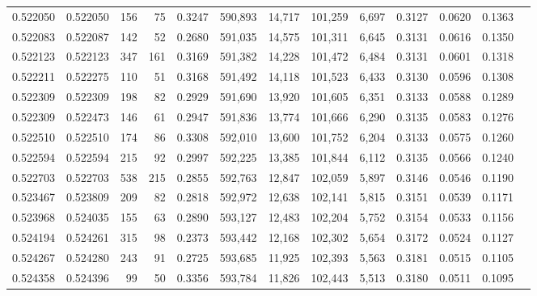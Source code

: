 \begin{tabular}{rrrrrrrrrrrrr}
0.522050 & 0.522050 &   156 &    75 &                                     0.3247 & 590,893 &  14,717 & 101,259 &   6,697 & 0.3127 & 0.0620 & 0.1363 \\
0.522083 & 0.522087 &   142 &    52 &                                     0.2680 & 591,035 &  14,575 & 101,311 &   6,645 & 0.3131 & 0.0616 & 0.1350 \\
0.522123 & 0.522123 &   347 &   161 &                                     0.3169 & 591,382 &  14,228 & 101,472 &   6,484 & 0.3131 & 0.0601 & 0.1318 \\
0.522211 & 0.522275 &   110 &    51 &                                     0.3168 & 591,492 &  14,118 & 101,523 &   6,433 & 0.3130 & 0.0596 & 0.1308 \\
0.522309 & 0.522309 &   198 &    82 &                                     0.2929 & 591,690 &  13,920 & 101,605 &   6,351 & 0.3133 & 0.0588 & 0.1289 \\
0.522309 & 0.522473 &   146 &    61 &                                     0.2947 & 591,836 &  13,774 & 101,666 &   6,290 & 0.3135 & 0.0583 & 0.1276 \\
0.522510 & 0.522510 &   174 &    86 &                                     0.3308 & 592,010 &  13,600 & 101,752 &   6,204 & 0.3133 & 0.0575 & 0.1260 \\
0.522594 & 0.522594 &   215 &    92 &                                     0.2997 & 592,225 &  13,385 & 101,844 &   6,112 & 0.3135 & 0.0566 & 0.1240 \\
0.522703 & 0.522703 &   538 &   215 &                                     0.2855 & 592,763 &  12,847 & 102,059 &   5,897 & 0.3146 & 0.0546 & 0.1190 \\
0.523467 & 0.523809 &   209 &    82 &                                     0.2818 & 592,972 &  12,638 & 102,141 &   5,815 & 0.3151 & 0.0539 & 0.1171 \\
0.523968 & 0.524035 &   155 &    63 &                                     0.2890 & 593,127 &  12,483 & 102,204 &   5,752 & 0.3154 & 0.0533 & 0.1156 \\
0.524194 & 0.524261 &   315 &    98 &                                     0.2373 & 593,442 &  12,168 & 102,302 &   5,654 & 0.3172 & 0.0524 & 0.1127 \\
0.524267 & 0.524280 &   243 &    91 &                                     0.2725 & 593,685 &  11,925 & 102,393 &   5,563 & 0.3181 & 0.0515 & 0.1105 \\
0.524358 & 0.524396 &    99 &    50 &                                     0.3356 & 593,784 &  11,826 & 102,443 &   5,513 & 0.3180 & 0.0511 & 0.1095 \\

\end{tabular}
